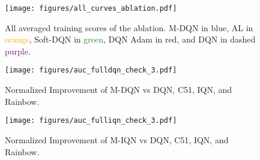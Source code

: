 \documentclass{article}
\begin{document}
\begin{figure}
\begin{center}
\texttt{[image: figures/all\_curves\_ablation.pdf]}
\caption{All averaged training scores of the ablation. M-DQN in \textcolor{NavyBlue}{blue}, AL in \textcolor{Orange}{orange}, Soft-DQN in \textcolor{ForestGreen}{green}, DQN Adam in  \textcolor{BrickRed}{red}, and DQN in dashed \textcolor{Purple}{purple}.\label{fig:full_ablation}}
\end{center}
\end{figure}


\begin{figure}
    \centering
    \texttt{[image: figures/auc\_fulldqn\_check\_3.pdf]}
    \caption{Normalized Improvement of M-DQN vs DQN, C51, IQN, and Rainbow.}
    \label{fig:super_bars_dqn}
\end{figure}

\begin{figure}
    \centering
    \texttt{[image: figures/auc\_fulliqn\_check\_3.pdf]}
    \caption{Normalized Improvement of M-IQN vs DQN, C51, IQN, and Rainbow.}
    \label{fig:super_barps_iqn}
\end{figure}
\end{document}
